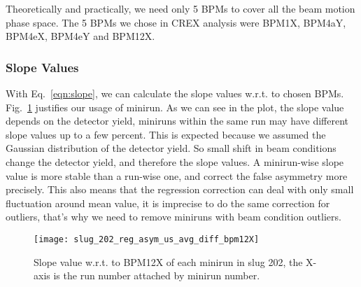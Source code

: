 \begin{comment}
For multiple detectors, it is easy to get:
\begin{equation}
    \small
    \begin{aligned}
	\begin{pmatrix}
	    \beta_{11}	& \beta_{21}    & \cdots & \beta_{m1}	\\
	    \beta_{12}	& \beta_{22}    & \cdots & \beta_{m2}	\\
	    \vdots	& \vdots    & \ddots	& \vdots\\
	    \beta_{1n}	& \beta_{2n}    & \cdots & \beta_{mn}	\\
	\end{pmatrix}
	&= A^{-1}
	&\times
	\begin{pmatrix}
	    cov(\Delta D^1, \Delta M^1) & cov(\Delta D^2, \Delta M^1)   & \cdots	& cov(\Delta D^m, \Delta M^1)	\\
	    cov(\Delta D^1, \Delta M^2) & cov(\Delta D^2, \Delta M^2)   & \cdots	& cov(\Delta D^m, \Delta M^2)	\\
	    \vdots	& \vdots    & \ddots	& \vdots    \\
	    cov(\Delta D^1, \Delta M^n) & cov(\Delta D^2, \Delta M^n)   & \cdots	& cov(\Delta D^m, \Delta M^n)	\\
	\end{pmatrix}
    \end{aligned}
    \label{eqn:slope}
\end{equation}
where $\beta_{ij}$ refers to detector i's response to change in monitor j.
\end{comment}

Theoretically and practically, we need only 5 BPMs to cover all the beam motion phase space.
The 5 BPMs we chose in CREX analysis were BPM1X, BPM4aY, BPM4eX, BPM4eY and BPM12X.

\subsubsection{Slope Values}
With Eq.~\ref{eqn:slope}, we can calculate the slope values w.r.t. to chosen 
BPMs. Fig.~\ref{fig:slug_202_reg_asym_us_avg_diff_bpm12X} justifies our usage
of minirun. As we can see in the plot, the slope value depends on the detector 
yield, miniruns within the same run may have different slope values up to a few 
percent. This is expected because we assumed the Gaussian distribution
of the detector yield. So small shift in beam conditions change the detector
yield, and therefore the slope values. A minirun-wise slope value is more stable
than a run-wise one, and correct the false asymmetry more precisely. This also
means that the regression correction can deal with only small fluctuation around 
mean value, it is imprecise to do the same correction for outliers, that's why
we need to remove miniruns with beam condition outliers.
\begin{figure}[H]
    \centering
    \texttt{[image: slug\_202\_reg\_asym\_us\_avg\_diff\_bpm12X]}
    \caption{Slope value w.r.t. to BPM12X of each minirun in slug 202, the X-axis 
    is the run number attached by minirun number.}
    \label{fig:slug_202_reg_asym_us_avg_diff_bpm12X}
\end{figure}

